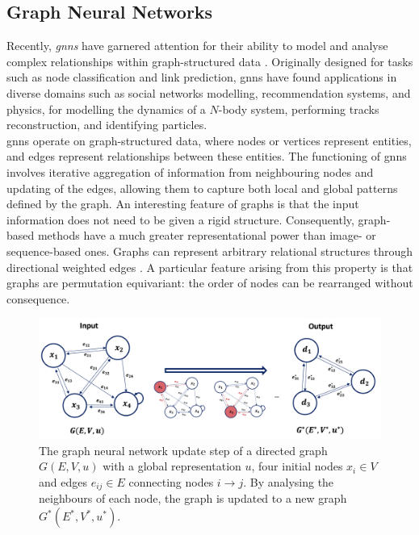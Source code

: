 \subsection{Graph Neural Networks}\label{chapter-GNN}
Recently, \textit{\glspl{gnn}} have garnered attention for their ability to model and analyse complex relationships within graph-structured data \cite{graphNetRef}. Originally designed for tasks such as node classification and link prediction, \glspl{gnn} have found applications in diverse domains such as social networks modelling, recommendation systems, and physics, for modelling the dynamics of a $N$-body system, performing tracks reconstruction, and identifying particles. \\

\glspl{gnn} operate on graph-structured data, where nodes or vertices represent entities, and edges represent relationships between these entities. The functioning of \glspl{gnn} involves iterative aggregation of information from neighbouring nodes and updating of the edges, allowing them to capture both local and global patterns defined by the graph. An interesting feature of graphs is that the input information does not need to be given a rigid structure. Consequently, graph-based methods have a much greater representational power than image- or sequence-based ones. Graphs can represent arbitrary relational structures through directional weighted edges \cite{graphInductiveBias}. A particular feature arising from this property is that graphs are permutation equivariant: the order of nodes can be rearranged without consequence. \\

\begin{figure}[h!]
    \center
    \includegraphics[width=\textwidth]{Images/ML/gnn.png}
    \caption{The graph neural network update step of a directed graph $G(E, V, u)$ with a global representation $u$, four initial nodes $x_i \in V$ and edges $e_{ij} \in E$ connecting nodes $i \rightarrow j$. By analysing the neighbours of each node, the graph is updated to a new graph $G^*(E^*, V^*, u^*)$.} %
    \label{fig:gnnScheme}
\end{figure}

